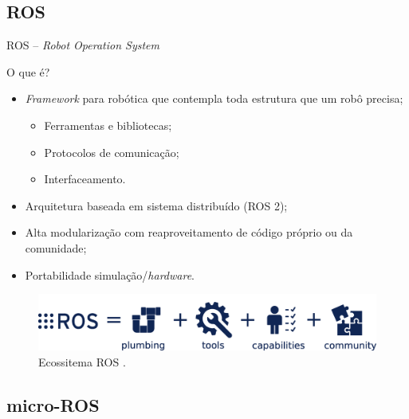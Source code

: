 \documentclass{if-beamer}
\begin{document}
\subsection*{ROS}

\begin{frame}{ROS -- \textit{Robot Operation System}}
	
	\begin{block}{O que é?}
		\begin{itemize}
			\item \textit{Framework} para robótica que contempla toda estrutura que um robô precisa;
			\begin{itemize}
				\item Ferramentas e bibliotecas;
				\item Protocolos de comunicação;
				\item Interfaceamento.
				
			\end{itemize}
			\item Arquitetura baseada em sistema distribuído (ROS 2);
			\item Alta modularização com reaproveitamento de código próprio ou da comunidade;
			\item Portabilidade simulação/\textit{hardware}.
		\end{itemize}
	\end{block}
	
	
\begin{figure}
	\centering
	\includegraphics[width=1\linewidth]{img/ros-equation.png}
	\caption{Ecossitema ROS \cite{ecoros}.}
	\label{fig:ros-equation}
\end{figure}
	
\end{frame}


\subsection*{micro-ROS}
\end{document}
